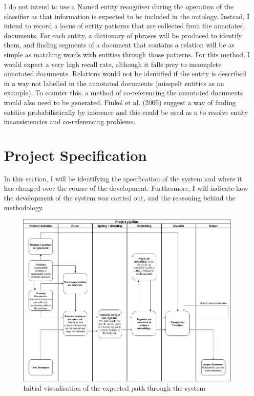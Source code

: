 \documentclass[12pt]{article} %
\begin{document}
I do not intend to use a Named entity recogniser during the operation of the classifier as that information is expected to be included in the ontology. Instead, I intend to record a locus of entity patterns that are collected from the annotated documents. For each entity, a dictionary of phrases will be produced to identify them, and finding segments of a document that contains a relation will be as simple as matching words with entities through those patterns. For this method, I would expect a very high recall rate, although it falls prey to incomplete annotated documents. Relations would not be identified if the entity is described in a way not labelled in the annotated documents (misspelt entities as an example). To counter this, a method of co-referencing the annotated documents would also need to be generated. Finkel et al. (2005) suggest a way of finding entities probabilistically by inference and this could be used as a to resolve entity inconsistencies and co-referencing problems.

\section{Project Specification}

In this section, I will be identifying the specification of the system and where it has changed over the course of the development. Furthermore, I will indicate how the development of the system was carried out, and the reasoning behind the methodology.

\begin{figure}[h]
    \centering
    \includegraphics[scale=0.4,natwidth=610,natheight=642]{Project-pipeline.png}
    \caption{Initial visualisation of the expected path through the system}
\end{figure}
\end{document}

